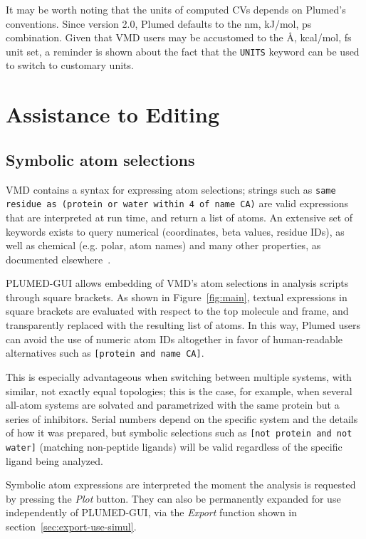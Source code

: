 \documentclass[preprint,12pt]{elsarticle}
\begin{document}
It may be worth noting that the units of computed CVs  depends on
Plumed's conventions.  Since version 2.0, Plumed defaults to the nm,
kJ/mol, ps combination. Given that VMD users may be accustomed to the
\AA, kcal/mol, fs unit set, a reminder is shown about the fact that
the \texttt{UNITS} keyword can be used to  switch to customary
units.



\section{Assistance to Editing}


\subsection{Symbolic atom selections}\label{sec:symb-atom-select}

VMD contains a syntax for expressing atom selections; strings such as
\texttt{same residue as (protein or water within 4 of name CA)} are valid
expressions that are interpreted at run time, and return a list of
atoms.  An extensive set of keywords exists to query numerical
(coordinates, beta values, residue IDs), as well as chemical
(e.g. polar, atom names) and many other properties, as documented
elsewhere~\cite{Humphrey_Dalke_Schulten_1996}.

PLUMED-GUI allows  embedding of VMD's atom selections in analysis scripts
through  square brackets. As shown in Figure~\ref{fig:main},
textual expressions in square brackets are evaluated with respect to
the top molecule and frame, and transparently replaced with the
resulting list of atoms. In this way, Plumed users can 
avoid the use of numeric atom IDs altogether in favor of human-readable
alternatives such as \texttt{[protein and name CA]}.

This is especially advantageous when switching between multiple
systems, with similar, not exactly equal topologies; this is the case,
for example, when several all-atom systems are solvated and
parametrized with the same protein but a series of inhibitors.  Serial
numbers  depend on the specific system and the details of how it was prepared, but
symbolic selections such as \texttt{[not protein and not water]}
(matching non-peptide ligands) will be valid
regardless of the specific ligand being analyzed.

Symbolic atom expressions are interpreted the moment the analysis is
requested by pressing the \emph{Plot} button. They can also be
permanently expanded for use independently of PLUMED-GUI, via the
\emph{Export} function shown in section~\ref{sec:export-use-simul}.
\end{document}
